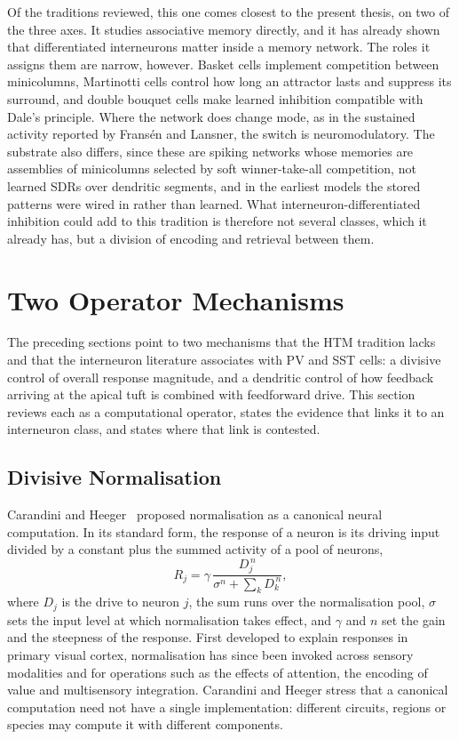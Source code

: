 Of the traditions reviewed, this one comes closest to the present thesis, on
two of the three axes. It studies associative memory directly, and it has
already shown that differentiated interneurons matter inside a memory network.
The roles it assigns them are narrow, however. Basket cells implement
competition between minicolumns, Martinotti cells control how long an
attractor lasts and suppress its surround, and double bouquet cells make
learned inhibition compatible with Dale's principle. Where the network does
change mode, as in the sustained activity reported by Fransén and Lansner, the
switch is neuromodulatory. The substrate also differs, since these are spiking
networks whose memories are assemblies of minicolumns selected by soft
winner-take-all competition, not learned SDRs over dendritic segments, and in
the earliest models the stored patterns were wired in rather than learned.
What interneuron-differentiated inhibition could add to this tradition is
therefore not several classes, which it already has, but a division of
encoding and retrieval between them.

\section{Two Operator Mechanisms}
\label{sec:comp-operators}

The preceding sections point to two mechanisms that the HTM tradition lacks and
that the interneuron literature associates with PV and SST cells: a divisive
control of overall response magnitude, and a dendritic control of how feedback
arriving at the apical tuft is combined with feedforward drive. This section
reviews each as a computational operator, states the evidence that links it to
an interneuron class, and states where that link is contested.

\subsection{Divisive Normalisation}
\label{subsec:comp-normalisation}

Carandini and Heeger~\cite{carandini2012normalization} proposed normalisation as
a canonical neural computation. In its standard form, the response of a neuron
is its driving input divided by a constant plus the summed activity of a pool of
neurons,
\begin{equation}
  R_j = \gamma \, \frac{D_j^{\,n}}{\sigma^{n} + \sum_k D_k^{\,n}},
  \label{eq:normalisation}
\end{equation}
where $D_j$ is the drive to neuron $j$, the sum runs over the normalisation pool,
$\sigma$ sets the input level at which normalisation takes effect, and $\gamma$
and $n$ set the gain and the steepness of the response. First developed to
explain responses in primary visual cortex, normalisation has since been
invoked across sensory modalities and for operations such as the effects of
attention, the encoding of value and multisensory integration. Carandini and
Heeger stress that a canonical computation need not have a single
implementation: different circuits, regions or species may compute it with
different components.


